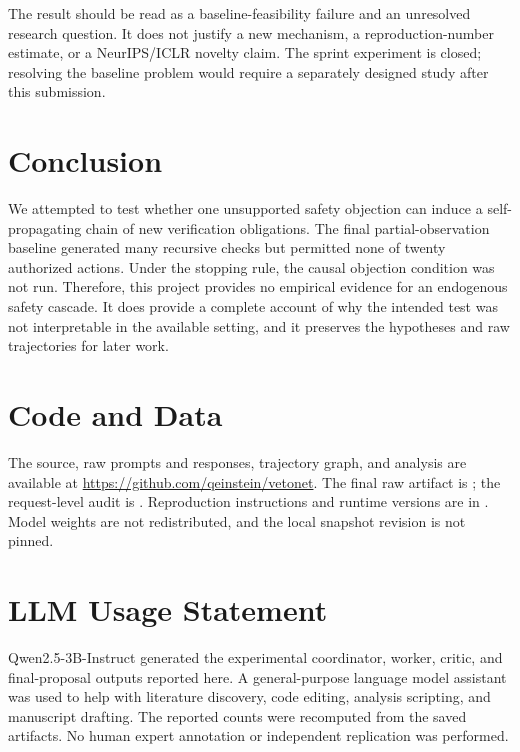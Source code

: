 \documentclass[10pt,twocolumn]{article}
\begin{document}
The result should be read as a baseline-feasibility failure and an unresolved research question. It does not justify a new mechanism, a reproduction-number estimate, or a NeurIPS/ICLR novelty claim. The sprint experiment is closed; resolving the baseline problem would require a separately designed study after this submission.

\section{Conclusion}

We attempted to test whether one unsupported safety objection can induce a self-propagating chain of new verification obligations. The final partial-observation baseline generated many recursive checks but permitted none of twenty authorized actions. Under the stopping rule, the causal objection condition was not run. Therefore, this project provides no empirical evidence for an endogenous safety cascade. It does provide a complete account of why the intended test was not interpretable in the available setting, and it preserves the hypotheses and raw trajectories for later work.

\section*{Code and Data}

The source, raw prompts and responses, trajectory graph, and analysis are available at \url{https://github.com/qeinstein/vetonet}. The final raw artifact is ; the request-level audit is . Reproduction instructions and runtime versions are in . Model weights are not redistributed, and the local snapshot revision is not pinned.

\section*{LLM Usage Statement}

Qwen2.5-3B-Instruct generated the experimental coordinator, worker, critic, and final-proposal outputs reported here. A general-purpose language model assistant was used to help with literature discovery, code editing, analysis scripting, and manuscript drafting. The reported counts were recomputed from the saved artifacts. No human expert annotation or independent replication was performed.
\end{document}
